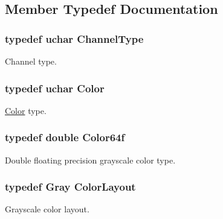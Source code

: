 \subsection{Member Typedef Documentation}
\hypertarget{struct_d_o_1_1_color_traits_3_01uchar_01_4_aea02f057eaa34dbc5eddf2ff26572206}{
\subsubsection[{Channel\-Type}]{\setlength{\rightskip}{0pt plus 5cm}typedef {\bf uchar} {\bf Channel\-Type}}}\label{struct_d_o_1_1_color_traits_3_01uchar_01_4_aea02f057eaa34dbc5eddf2ff26572206}
Channel type. \hypertarget{struct_d_o_1_1_color_traits_3_01uchar_01_4_a6a6b36f9ac287bde85a4a9a4a0cd4430}{
\subsubsection[{Color}]{\setlength{\rightskip}{0pt plus 5cm}typedef {\bf uchar} {\bf Color}}}\label{struct_d_o_1_1_color_traits_3_01uchar_01_4_a6a6b36f9ac287bde85a4a9a4a0cd4430}
\hyperlink{class_d_o_1_1_color}{Color} type. \hypertarget{struct_d_o_1_1_color_traits_3_01uchar_01_4_a9a301fd8ba0a7225e38351d3e5b2e4d3}{
\subsubsection[{Color64f}]{\setlength{\rightskip}{0pt plus 5cm}typedef double {\bf Color64f}}}\label{struct_d_o_1_1_color_traits_3_01uchar_01_4_a9a301fd8ba0a7225e38351d3e5b2e4d3}
Double floating precision grayscale color type. \hypertarget{struct_d_o_1_1_color_traits_3_01uchar_01_4_a7c9d599cfa0d1404784fbe60e6bcfd24}{
\subsubsection[{Color\-Layout}]{\setlength{\rightskip}{0pt plus 5cm}typedef {\bf Gray} {\bf Color\-Layout}}}\label{struct_d_o_1_1_color_traits_3_01uchar_01_4_a7c9d599cfa0d1404784fbe60e6bcfd24}
Grayscale color layout. 

